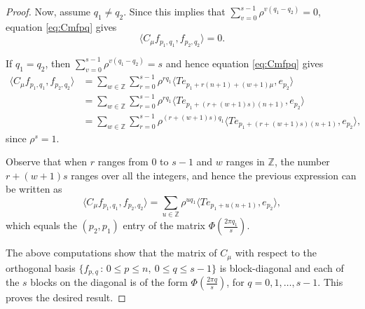 \documentclass[10pt,a4paper]{amsart}
\newcommand{\Z}{{\mathbb{Z}}}
\begin{document}
\begin{proof}
Now, assume $q_1 \neq q_2$. Since this implies that  $\sum_{v=0}^{s-1} \rho^{v(q_1-q_2)}=0$, equation \eqref{eq:Cmfpq} gives
\[
\langle C_{\mu} f_{p_1, q_1}, f_{p_2, q_2} \rangle =0.
\]

If $q_1=q_2$, then $\sum_{v=0}^{s-1} \rho^{v(q_1-q_2)}=s$ and hence equation \eqref{eq:Cmfpq} gives
\begin{align*}
\langle C_{\mu} f_{p_1, q_1}, f_{p_2, q_2} \rangle 
&=\sum_{w \in {\mathbb Z}}
       \sum_{r=0}^{s-1} \rho^{r q_1}  \langle
      T e_{p_1 + r(n+1) +(w+1) \mu}, e_{p_2} \rangle \\
&=\sum_{w \in {\mathbb Z}}
       \sum_{r=0}^{s-1} \rho^{r q_1}  \langle
      T e_{p_1 + (r+(w+1)s)(n+1)}, e_{p_2} \rangle \\
&=\sum_{w \in {\mathbb Z}}
       \sum_{r=0}^{s-1} \rho^{(r+(w+1)s)q_1}  \langle
      T e_{p_1 + (r+(w+1)s)(n+1)}, e_{p_2} \rangle,
\end{align*}
since $\rho^s=1$.

Observe that when $r$ ranges from $0$ to $s-1$ and $w$ ranges in $\Z$, the number $r+(w+1)s$ ranges over all the integers, and hence the previous expression can be written as
\[
\langle C_{\mu} f_{p_1, q_1}, f_{p_2, q_2} \rangle = \sum_{u \in {\mathbb Z}} \rho^{u q_1}  \langle
      T e_{p_1 + u (n+1)}, e_{p_2} \rangle,
\]
which equals the $(p_2,p_1)$ entry of the matrix $\Phi\left(\frac{2\pi q_1}{s}\right)$.

The above computations show that the matrix of $C_\mu$ with respect to the orthogonal basis $\{ f_{p,q} \, : \, 0 \leq p \leq n, \ 0  \leq q \leq s-1\}$ is block-diagonal and each of the $s$ blocks on the diagonal is of the form $\Phi\left(\frac{2\pi q}{s}\right)$, for $q=0, 1, \dots, s-1$. This proves the desired result.
\end{proof}
\end{document}
